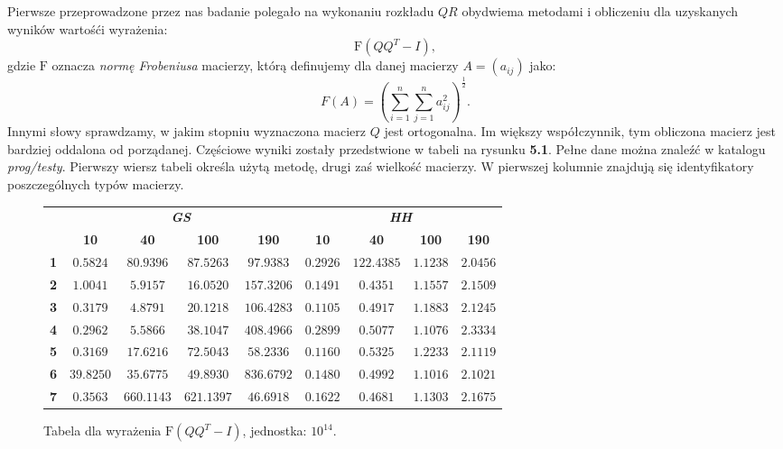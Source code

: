 Pierwsze przeprowadzone przez nas badanie polegało na wykonaniu rozkładu $QR$
obydwiema metodami i obliczeniu dla uzyskanych wyników wartośći wyrażenia:
$$\mathrm{F}(QQ^T - I),$$
gdzie $\mathrm{F}$ oznacza \textit{normę Frobeniusa} macierzy, którą definujemy
dla danej macierzy $A=(a_{ij})$ jako:
$$F(A)=(\sum_{i=1}^{n} \sum_{j=1}^{n} a_{ij}^2)^\frac{1}{2}.$$
Innymi słowy sprawdzamy, w jakim stopniu wyznaczona macierz $Q$ jest ortogonalna. Im większy
współczynnik, tym obliczona macierz jest bardziej oddalona od porządanej. Częściowe wyniki zostały przedstwione
w tabeli na rysunku \textbf{5.1}. Pełne dane można znaleźć w katalogu \textit{prog/testy}. Pierwszy wiersz tabeli 
określa użytą metodę, drugi zaś wielkość macierzy. W pierwszej kolumnie znajdują się identyfikatory poszczególnych typów
macierzy.
\begin{figure}[h!tb]
\begin{center}
\begin{tabular}{|l||c|c|c|c||c|c|c|c|}
\hline
\multirow{2}{*}{} & \multicolumn{4}{|c||}{\textbf{\textit{GS}}} & \multicolumn{4}{|c|}{\textbf{\textit{HH}}}\\
\cline{2-9}
&\textbf{10} & \textbf{40} & \textbf{100} & \textbf{190} & \textbf{10} & \textbf{40} & \textbf{100} & \textbf{190} \\
\hline
\hline
\textbf{1} & $0.5824$ & $80.9396$ & $87.5263$ & $97.9383$ & $0.2926$ & $122.4385$ & $1.1238$ & $2.0456$ \\
\hline
\textbf{2} & $1.0041$ & $5.9157$ & $16.0520$ & $157.3206$ & $0.1491$ & $0.4351$ & $1.1557$ & $2.1509$ \\
\hline
\textbf{3} & $ 0.3179$ & $4.8791$ & $20.1218$ & $106.4283$ & $0.1105$ & $0.4917$ & $1.1883$ & $2.1245$ \\
\hline
\textbf{4} & $ 0.2962$ & $5.5866$ & $38.1047$ & $408.4966$ & $0.2899$ & $0.5077$ & $1.1076$ & $2.3334$ \\
\hline
\textbf{5} & $ 0.3169$ & $17.6216$ & $72.5043$ & $58.2336$ & $0.1160$ & $0.5325$ & $1.2233$ & $2.1119$ \\
\hline
\textbf{6} & $ 39.8250$ & $35.6775$ & $49.8930$ & $836.6792$ & $0.1480$ & $0.4992$ & $1.1016$ & $2.1021$ \\
\hline
\textbf{7} & $ 0.3563$ & $660.1143$ & $621.1397$ & $46.6918$ & $0.1622$ & $0.4681$ & $1.1303$ & $2.1675$ \\
\hline
\end{tabular}
\caption{Tabela dla wyrażenia $\mathrm{F}(QQ^T - I)$, jednostka: $10^{14}$.} 
\end{center}
\end{figure}

